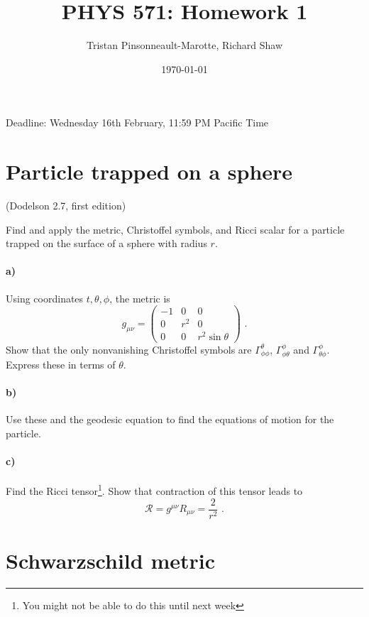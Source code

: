 \documentclass[12pt]{article}
\author{Tristan Pinsonneault-Marotte, Richard Shaw}
\title{PHYS 571: Homework 1}
\date{\today}
\begin{document}
\maketitle

Deadline: Wednesday 16th February, 11:59 PM Pacific Time

\section{Particle trapped on a sphere}
(Dodelson 2.7, first edition)

Find and apply the metric, Christoffel symbols, and Ricci scalar for a particle
trapped on the surface of a sphere with radius $r$.

\paragraph{a)} Using coordinates $t, \theta, \phi$, the metric is
\begin{equation}
    g_{\mu\nu} = \begin{pmatrix}
        -1 & 0 & 0 \\
        0 & r^2 & 0 \\
        0 & 0 & r^2 \sin\theta
    \end{pmatrix}
    \text{ .}
\end{equation}
Show that the only nonvanishing Christoffel symbols are
$\Gamma^\theta_{\phi\phi}$, $\Gamma^\phi_{\phi\theta}$ and
$\Gamma^\phi_{\theta\phi}$. Express these in terms of $\theta$.

\paragraph{b)} Use these and the geodesic equation to find the equations of
motion for the particle.

\paragraph{c)} Find the Ricci tensor\footnote{You might not be able to do this until next week}. Show that contraction of this tensor leads
to
\begin{equation}
    \mathcal{R} = g^{\mu\nu} R_{\mu\nu} = \frac{2}{r^2} \text{ .}
\end{equation}

\section{Schwarzschild metric}
\end{document}
